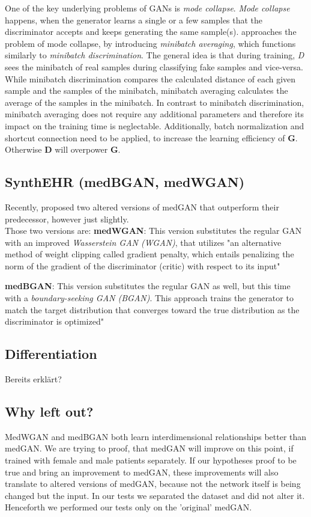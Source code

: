 \documentclass[11pt, a4paper]{book}
\begin{document}
One of the key underlying problems of GANs is \textit{mode collapse}. \textit{Mode collapse} happens, when the generator learns a single or a few samples that the discriminator accepts and keeps generating the same sample(s).
\cite{Choi2017} approaches the problem of mode collapse, by introducing \textit{minibatch averaging}, which functions similarly to \textit{minibatch discrimination}. The general idea is that during training, \textit{D} sees the minibatch of real samples during classifying fake samples and vice-versa.
While minibatch discrimination compares the calculated distance of each given sample and the samples of the minibatch, minibatch averaging calculates the average of the samples in the minibatch. In contrast to minibatch discrimination, minibatch averaging does not require any additional parameters and therefore its impact on the training time is neglectable. \cite{Choi2017}
Additionally, batch normalization and shortcut connection need to be applied, to increase the learning efficiency of \textbf{G}. Otherwise \textbf{D} will overpower \textbf{G}. \cite{Choi2017}

\subsection{SynthEHR (medBGAN, medWGAN)}
Recently, \cite{Baowaly2018} proposed two altered versions of medGAN that outperform their predecessor, however just slightly.
\\
Those two versions are:
\textbf{medWGAN}: This version substitutes the regular GAN with an improved \textit{Wasserstein GAN (WGAN)}, that utilizes "an alternative method of weight clipping called gradient penalty, which entails penalizing the norm of the gradient of the discriminator (critic) with respect to its input" \cite{Baowaly2018}

\textbf{medBGAN}: This version substitutes the regular GAN as well, but this time with a \textit{boundary-seeking GAN (BGAN)}. This approach trains the generator to match the target distribution that converges toward the true distribution as the discriminator is optimized" \cite{Baowaly2018}
\subsection{Differentiation}
Bereits erklärt?
\subsection{Why left out?}
MedWGAN and medBGAN both learn interdimensional relationships better than medGAN. We are trying to proof, that medGAN will improve on this point, if trained with female and male patients separately.
If our hypotheses proof to be true and bring an improvement to medGAN, these improvements will also translate to altered versions of medGAN, because not the network itself is being changed but the input. In our tests we separated the dataset and did not alter it. Henceforth we performed our tests only on the 'original' medGAN. 
\end{document}
